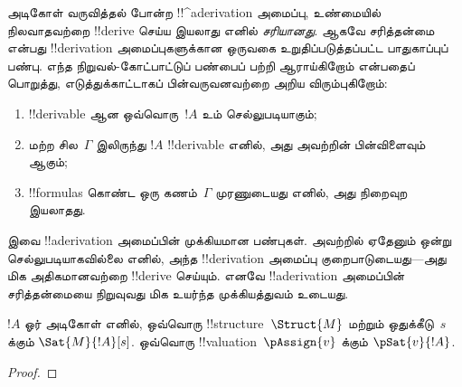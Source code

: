 \documentclass[../../../include/open-logic-section]{subfiles}
\begin{document}
      {}
      {}
      

\begin{explain}
அடிகோள் வருவித்தல் போன்ற !!^a{derivation} அமைப்பு, உண்மையில் நிலவாதவற்றை
!!{derive} செய்ய இயலாது எனில் \emph{சரியானது}. ஆகவே சரித்தன்மை என்பது
!!{derivation} அமைப்புகளுக்கான ஒருவகை உறுதிப்படுத்தப்பட்ட பாதுகாப்புப் பண்பு.
எந்த நிறுவல்-கோட்பாட்டுப் பண்பைப் பற்றி ஆராய்கிறோம் என்பதைப் பொறுத்து,
எடுத்துக்காட்டாகப் பின்வருவனவற்றை அறிய விரும்புகிறோம்:
\begin{enumerate}
\item !!{derivable} ஆன ஒவ்வொரு~$!A$ உம் செல்லுபடியாகும்;
\item மற்ற சில~$\Gamma$ இலிருந்து $!A$ !!{derivable} எனில், அது அவற்றின்
  பின்விளைவும் ஆகும்;
\item !!{formula}s கொண்ட ஒரு கணம்~$\Gamma$ முரணுடையது எனில், அது
  நிறைவுற இயலாதது.
\end{enumerate}
இவை !!a{derivation} அமைப்பின் முக்கியமான பண்புகள். அவற்றில் ஏதேனும் ஒன்று
செல்லுபடியாகவில்லை எனில், அந்த !!{derivation} அமைப்பு குறைபாடுடையது---அது
மிக அதிகமானவற்றை !!{derive} செய்யும். எனவே !!a{derivation} அமைப்பின்
சரித்தன்மையை நிறுவுவது மிக உயர்ந்த முக்கியத்துவம் உடையது.
\end{explain}

\begin{prop}
  $!A$ ஓர் அடிகோள் எனில்,
    {ஒவ்வொரு !!{structure}~$\Struct{M}$ மற்றும் ஒதுக்கீடு~$s$ க்கும் $\Sat{M}{!A}[s]$.}
    {ஒவ்வொரு !!{valuation}~$\pAssign{v}$ க்கும் $\pSat{v}{!A}$.}
\end{prop}

\begin{proof}
\end{proof}
\end{document}
